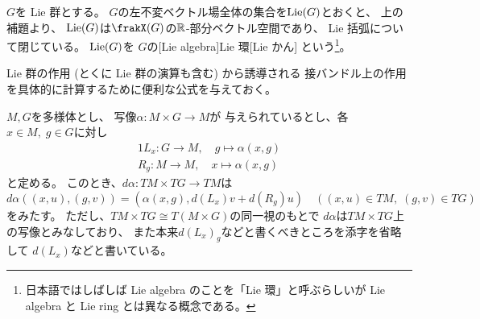 \documentclass[report]{jlreq}
\begin{document}
\begin{definition}
    $G$を Lie 群とする。
    $G$の左不変ベクトル場全体の集合を$\operatorname{Lie}(G)$とおくと、
    上の補題より、
    $\operatorname{Lie}(G)$は$\frakX(G)$の$\mathbb{R}$-部分ベクトル空間であり、
    Lie 括弧について閉じている。
    $\operatorname{Lie}(G)$を
    $G$の[Lie algebra]{Lie 環}[Lie かん]
    という\footnote{
        日本語ではしばしば Lie algebra のことを「Lie 環」と呼ぶらしいが
        Lie algebra と Lie ring とは異なる概念である。
    }。
\end{definition}

Lie 群の作用 (とくに Lie 群の演算も含む) から誘導される
接バンドル上の作用を具体的に計算するために便利な公式を与えておく。

\begin{lemma}
    $M, G$を多様体とし、
    {\smooth}写像$\alpha \colon M \times G \to M$が
    与えられているとし、各$x \in M, \; g \in G$に対し
    \begin{alignat}{1}
        L_x \colon G \to M, \quad g \mapsto \alpha(x, g) \\
        R_g \colon M \to M, \quad x \mapsto \alpha(x, g)
    \end{alignat}
    と定める。
    このとき、$d\alpha \colon TM \times TG \to TM$は
    \begin{equation}
        d\alpha((x, u), (g, v))
            = (\alpha(x, g), d(L_x) v + d(R_g) u)
            \quad
            ((x, u) \in TM, \; (g, v) \in TG)
    \end{equation}
    をみたす。
    ただし、$TM \times TG \cong T(M \times G)$の同一視のもとで
    $d\alpha$は$TM \times TG$上の写像とみなしており、
    また本来$d(L_x)_g$などと書くべきところを添字を省略して
    $d(L_x)$などと書いている。
\end{lemma}
\end{document}
